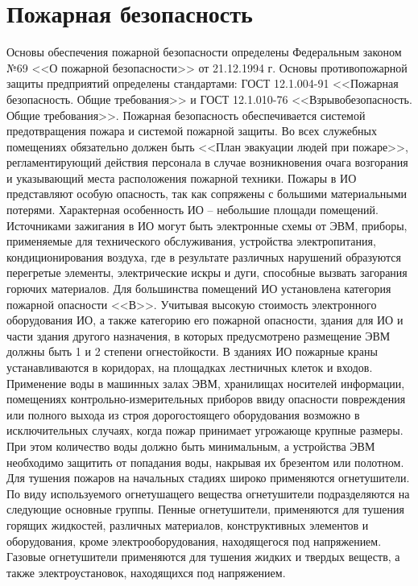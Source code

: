 \documentclass[utf8,usehyperref,12pt]{G7-32}
\begin{document}
\section{Пожарная безопасность}
Основы обеспечения пожарной безопасности определены Федеральным законом №69 <<О пожарной безопасности>> от 21.12.1994 г. Основы противопожарной защиты предприятий определены стандартами: ГОСТ 12.1.004-91 <<Пожарная безопасность. Общие требования>> и ГОСТ 12.1.010-76 <<Взрывобезопасность. Общие требования>>.
Пожарная безопасность обеспечивается системой предотвращения пожара и системой пожарной защиты. Во всех служебных помещениях обязательно должен быть <<План эвакуации людей при пожаре>>, регламентирующий действия персонала в случае возникновения очага возгорания и указывающий места расположения пожарной техники. 
Пожары в ИО представляют особую опасность, так как сопряжены с большими материальными потерями. Характерная особенность ИО – небольшие площади помещений. 
Источниками зажигания в ИО могут быть электронные схемы от ЭВМ, приборы, применяемые для технического обслуживания, устройства электропитания, кондиционирования воздуха, где в результате различных нарушений образуются перегретые элементы, электрические искры и дуги, способные вызвать загорания горючих материалов. 
Для большинства помещений ИО установлена категория пожарной опасности <<В>>. 
Учитывая высокую стоимость электронного оборудования ИО, а также категорию его пожарной опасности, здания для ИО и части здания другого назначения, в которых предусмотрено размещение ЭВМ должны быть 1 и 2 степени огнестойкости. 
В зданиях ИО пожарные краны устанавливаются в коридорах, на площадках лестничных клеток и входов. Применение воды в машинных залах ЭВМ, хранилищах носителей информации, помещениях контрольно-измерительных приборов ввиду опасности повреждения или полного выхода из строя дорогостоящего оборудования возможно в исключительных случаях, когда пожар принимает угрожающе крупные размеры. При этом количество воды должно быть минимальным, а устройства ЭВМ необходимо защитить от попадания воды, накрывая их брезентом или полотном. 
Для тушения пожаров на начальных стадиях широко применяются огнетушители. По виду используемого огнетушащего вещества огнетушители подразделяются 
на следующие основные группы. 
Пенные огнетушители, применяются для тушения горящих жидкостей, различных материалов, конструктивных элементов и оборудования, кроме электрооборудования, находящегося под напряжением.
Газовые огнетушители применяются для тушения жидких и твердых веществ, а также электроустановок, находящихся под напряжением. 
\end{document}

